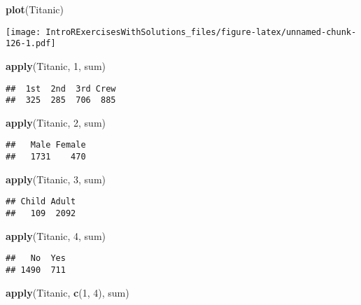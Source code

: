 \documentclass[]{article}
\newenvironment{Shaded}{\begin{snugshade}}{\end{snugshade}}
\newcommand{\KeywordTok}[1]{\textcolor[rgb]{0.13,0.29,0.53}{\textbf{#1}}}
\newcommand{\DecValTok}[1]{\textcolor[rgb]{0.00,0.00,0.81}{#1}}
\newcommand{\NormalTok}[1]{#1}
\begin{document}
\begin{Shaded}
\begin{Highlighting}[]
\KeywordTok{plot}\NormalTok{(Titanic)}
\end{Highlighting}
\end{Shaded}

\texttt{[image: IntroRExercisesWithSolutions\_files/figure-latex/unnamed-chunk-126-1.pdf]}

\begin{Shaded}
\begin{Highlighting}[]
\KeywordTok{apply}\NormalTok{(Titanic, }\DecValTok{1}\NormalTok{, sum)}
\end{Highlighting}
\end{Shaded}

\begin{verbatim}
##  1st  2nd  3rd Crew 
##  325  285  706  885
\end{verbatim}

\begin{Shaded}
\begin{Highlighting}[]
\KeywordTok{apply}\NormalTok{(Titanic, }\DecValTok{2}\NormalTok{, sum)}
\end{Highlighting}
\end{Shaded}

\begin{verbatim}
##   Male Female 
##   1731    470
\end{verbatim}

\begin{Shaded}
\begin{Highlighting}[]
\KeywordTok{apply}\NormalTok{(Titanic, }\DecValTok{3}\NormalTok{, sum)}
\end{Highlighting}
\end{Shaded}

\begin{verbatim}
## Child Adult 
##   109  2092
\end{verbatim}

\begin{Shaded}
\begin{Highlighting}[]
\KeywordTok{apply}\NormalTok{(Titanic, }\DecValTok{4}\NormalTok{, sum)}
\end{Highlighting}
\end{Shaded}

\begin{verbatim}
##   No  Yes 
## 1490  711
\end{verbatim}

\begin{Shaded}
\begin{Highlighting}[]
\KeywordTok{apply}\NormalTok{(Titanic, }\KeywordTok{c}\NormalTok{(}\DecValTok{1}\NormalTok{, }\DecValTok{4}\NormalTok{), sum)}
\end{Highlighting}
\end{Shaded}
\end{document}
